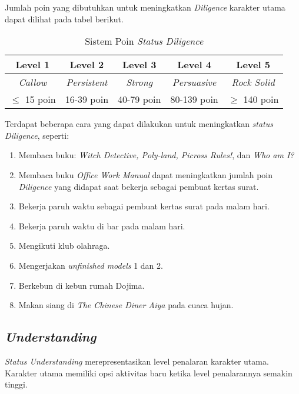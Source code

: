 Jumlah poin yang dibutuhkan untuk meningkatkan \textit{Diligence} karakter utama dapat dilihat pada tabel berikut.
\begin{table}[htb]
    \begin{center}
        \begin{tabular}{ | c | c | c | c | c | }
            \hline
            Level 1         & Level 2             & Level 3         & Level 4             & Level 5             \\
            \hline
            \textit{Callow} & \textit{Persistent} & \textit{Strong} & \textit{Persuasive} & \textit{Rock Solid} \\
            \hline
            $\le$ 15 poin   & 16-39 poin          & 40-79 poin      & 80-139 poin         & $\ge$ 140 poin      \\
            \hline
        \end{tabular}
    \end{center}
    \caption{Sistem Poin \textit{Status Diligence}}
\end{table}

Terdapat beberapa cara yang dapat dilakukan untuk meningkatkan \textit{status Diligence}, seperti:
\begin{enumerate}
    \item Membaca buku: \textit{ Witch Detective, Poly-land, Picross Rules!}, dan \textit{Who am I?}
    \item Membaca buku \textit{Office Work Manual} dapat meningkatkan jumlah poin \textit{Diligence} yang didapat saat bekerja sebagai pembuat kertas surat.
    \item Bekerja paruh waktu sebagai pembuat kertas surat pada malam hari.
    \item Bekerja paruh waktu di bar pada malam hari.
    \item Mengikuti klub olahraga.
    \item Mengerjakan \textit{unfinished models} 1 dan 2.
    \item Berkebun di kebun rumah Dojima.
    \item Makan siang di \textit{The Chinese Diner Aiya} pada cuaca hujan.
\end{enumerate}

\subsection{\textit{Understanding}}
\textit{Status Understanding} merepresentasikan level penalaran karakter utama. Karakter utama memiliki opsi aktivitas baru ketika level penalarannya semakin tinggi.

